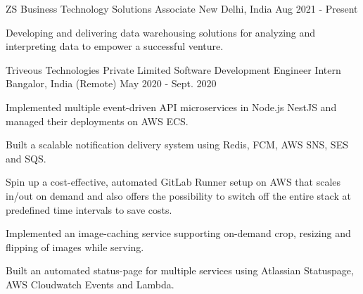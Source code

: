 

\begin{cventries}

  \cventry
    {ZS} %
    {Business Technology Solutions Associate} %
    {New Delhi, India} %
    {Aug 2021 - Present} %
    {
      \begin{cvitems} %
        \item {Developing and delivering data warehousing solutions for analyzing and interpreting data to empower a successful venture.}
      \end{cvitems}
    }

  \cventry
    {Triveous Technologies Private Limited} %
    {Software Development Engineer Intern} %
    {Bangalor, India (Remote)} %
    {May 2020 - Sept. 2020} %
    {
      \begin{cvitems} %
        \item {Implemented multiple event-driven API microservices in Node.js NestJS and managed their deployments on AWS ECS.}
        \item {Built a scalable notification delivery system using Redis, FCM, AWS SNS, SES and SQS.}
        \item {Spin up a cost-effective, automated GitLab Runner setup on AWS that scales in/out on demand and also offers the possibility to switch off the entire stack at predefined time intervals to save costs.}
        \item {Implemented an image-caching service supporting on-demand crop, resizing and flipping of images while serving.}
        \item {Built an automated status-page for multiple services using Atlassian Statuspage, AWS Cloudwatch Events and Lambda.}
      \end{cvitems}
    }


\end{cventries}
